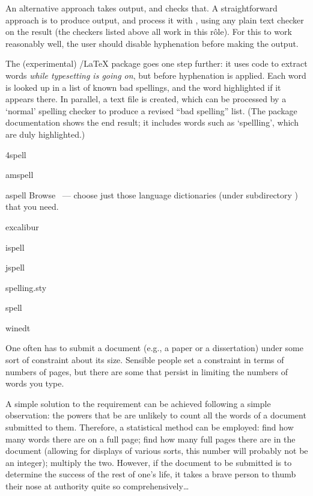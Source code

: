 An alternative approach takes \alltex{} output, and checks that.  A
straightforward approach is to produce  output, and process
it with , using any plain text checker on the
result (the checkers listed above all work in this r\^ole).  For this
to work reasonably well, the user should disable hyphenation before
making the  output.

The (experimental) \LuaTeX{}/\LaTeX{} package  goes
one step further: it uses  code to extract words
\emph{while typesetting is going on}, but before hyphenation is
applied.  Each word is looked up in a list of known bad spellings, and
the word highlighted if it appears there.  In parallel, a text file is
created, which can be processed by a `normal' spelling checker to
produce a revised ``bad spelling'' list.  (The package documentation
shows the end result; it includes words such as `spellling', which are
duly highlighted.)
\begin{ctanrefs}
\item[4spell]
\item[amspell]
\item[aspell]Browse ~--- choose just those language
  dictionaries (under subdirectory ) that you need.
\item[excalibur]
\item[ispell]
\item[jspell]
\item[spelling.sty]
\item[\nothtml{\bgroup\rmfamily}\acro{VMS}\nothtml{\egroup} spell]%
\item[winedt]
\end{ctanrefs}


One often has to submit a document (e.g., a paper or a dissertation)
under some sort of constraint about its size.  Sensible people set a
constraint in terms of numbers of pages, but there are some that
persist in limiting the numbers of words you type.

A simple solution to the requirement can be achieved following a
simple observation: the powers that be are unlikely to count all the
words of a document submitted to them.  Therefore, a statistical
method can be employed: find how many words there are on a full page;
find how many full pages there are in the document (allowing for
displays of various sorts, this number will probably not be an
integer); multiply the two.  However, if the document to be submitted
is to determine the success of the rest of one's life, it takes a
brave person to thumb their nose at authority quite so
comprehensively\dots{}

